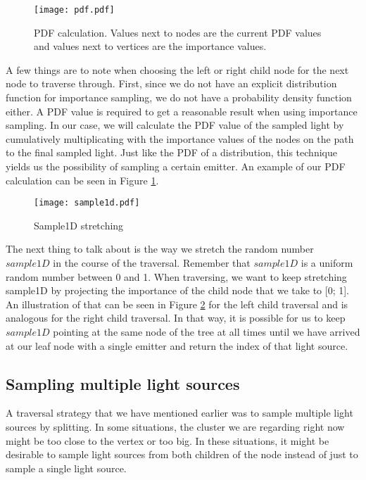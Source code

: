 \begin{figure}
	\begin{center}
		\texttt{[image: pdf.pdf]}
		\caption{PDF calculation. Values next to nodes are the current PDF values and values next to vertices are the importance values.}
		\label{fig:pdf}
	\end{center}
\end{figure}

A few things are to note when choosing the left or right child node for the next node to traverse through. First, since we do not have an explicit distribution function for importance sampling, we do not have a probability density function either. A PDF value is required to get a reasonable result when using importance sampling. In our case, we will calculate the PDF value of the sampled light by cumulatively multiplicating with the importance values of the nodes on the path to the final sampled light. Just like the PDF of a distribution, this technique yields us the possibility of sampling a certain emitter. An example of our PDF calculation can be seen in Figure \ref{fig:pdf}.

\begin{figure}
	\begin{center}
		\texttt{[image: sample1d.pdf]}
		\caption{Sample1D stretching}
		\label{fig:sample1d}
	\end{center}
\end{figure}


The next thing to talk about is the way we stretch the random number $sample1D$ in the course of the traversal. Remember that $sample1D$ is a uniform random number between 0 and 1. When traversing, we want to keep stretching sample1D by projecting the importance of the child node that we take to [0; 1]. An illustration of that can be seen in Figure \ref{fig:sample1d} for the left child traversal and is analogous for the right child traversal. In that way, it is possible for us to keep $sample1D$ pointing at the same node of the tree at all times until we have arrived at our leaf node with a single emitter and return the index of that light source.

\subsection{Sampling multiple light sources}
\label{subs:mult}

A traversal strategy that we have mentioned earlier was to sample multiple light sources by splitting. In some situations, the cluster we are regarding right now might be too close to the vertex or too big. In these situations, it might be desirable to sample light sources from both children of the node instead of just to sample a single light source.

